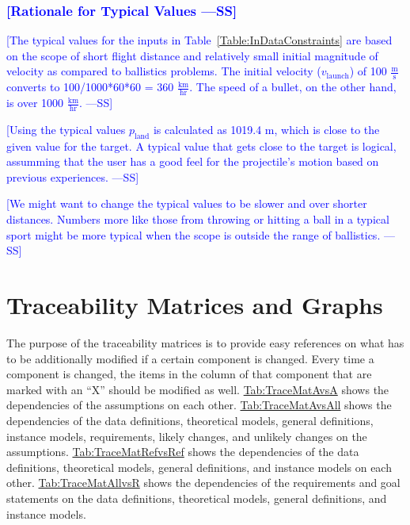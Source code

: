 \documentclass[12pt]{article}
\newcommand{\authornote}[3]{\textcolor{#1}{[#3 ---#2]}}
\newcommand{\authornote}[3]{}
\newcommand{\wss}[1]{\authornote{blue}{SS}{#1}}
\begin{document}
\subsubsection{\wss{Rationale for Typical Values}}

\wss{The typical values for the inputs in Table~\ref{Table:InDataConstraints}
are based on the scope of short flight distance and relatively small initial
magnitude of velocity as compared to ballistics problems. The initial velocity
($v_\text{launch}$) of 100 $\frac{\text{m}}{\text{s}}$ converts to
100/1000*60*60 = 360 $\frac{\text{km}}{\text{hr}}$. The speed of a bullet, on
the other hand, is over 1000 $\frac{\text{km}}{\text{hr}}$.}

\wss{Using the typical values $p_\text{land}$ is calculated as 1019.4 m, which is
close to the given value for the target.  A typical value that gets close to the
target is logical, assumming that the user has a good feel for the projectile's
motion based on previous experiences.}

\wss{We might want to change the typical values to be slower and over shorter
distances.  Numbers more like those from throwing or hitting a ball in a typical
sport might be more typical when the scope is outside the range of ballistics.}

\section{Traceability Matrices and Graphs}
\label{Sec:TraceMatrices}
The purpose of the traceability matrices is to provide easy references on what
has to be additionally modified if a certain component is changed. Every time a
component is changed, the items in the column of that component that are marked
with an ``X'' should be modified as well.
\hyperref[Table:TraceMatAvsA]{Tab:TraceMatAvsA} shows the dependencies of the
assumptions on each other. \hyperref[Table:TraceMatAvsAll]{Tab:TraceMatAvsAll}
shows the dependencies of the data definitions, theoretical models, general
definitions, instance models, requirements, likely changes, and unlikely changes
on the assumptions. \hyperref[Table:TraceMatRefvsRef]{Tab:TraceMatRefvsRef}
shows the dependencies of the data definitions, theoretical models, general
definitions, and instance models on each other.
\hyperref[Table:TraceMatAllvsR]{Tab:TraceMatAllvsR} shows the dependencies of
the requirements and goal statements on the data definitions, theoretical
models, general definitions, and instance models.
\end{document}
